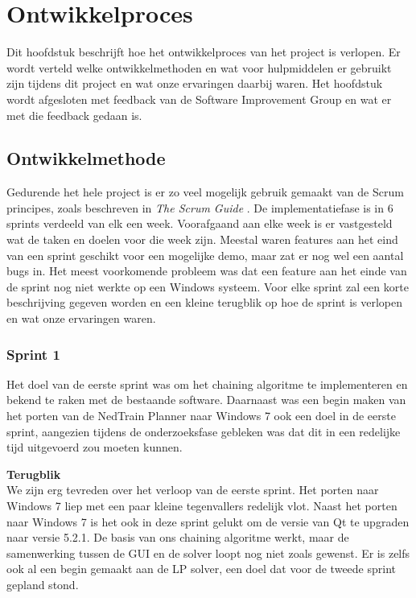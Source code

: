 \section{Ontwikkelproces}
Dit hoofdstuk beschrijft hoe het ontwikkelproces van het project is verlopen. Er wordt verteld welke ontwikkelmethoden en wat voor hulpmiddelen er gebruikt zijn tijdens dit project en wat onze ervaringen daarbij waren. Het hoofdstuk wordt afgesloten met feedback van de Software Improvement Group en wat er met die feedback gedaan is. 

\subsection{Ontwikkelmethode}
Gedurende het hele project is er zo veel mogelijk gebruik gemaakt van de Scrum principes, zoals beschreven in \emph{The Scrum Guide} \cite{schwaber2011}. De implementatiefase is in 6 sprints verdeeld van elk een week. Voorafgaand aan elke week is er vastgesteld wat de taken en doelen voor die week zijn.  Meestal waren features aan het eind van een sprint geschikt voor een mogelijke demo, maar zat er nog wel een aantal bugs in. Het meest voorkomende probleem was dat een feature aan het einde van de sprint nog niet werkte op een Windows systeem. Voor elke sprint zal een korte beschrijving gegeven worden en een kleine terugblik op hoe de sprint is verlopen en wat onze ervaringen waren.

\subsubsection{Sprint 1}
Het doel van de eerste sprint was om het chaining algoritme te implementeren en bekend te raken met de bestaande software. Daarnaast was een begin maken van het porten van de NedTrain Planner naar Windows 7 ook een doel in de eerste sprint, aangezien tijdens de onderzoeksfase gebleken was dat dit in een redelijke tijd uitgevoerd zou moeten kunnen.

\textbf{Terugblik} \\
We zijn erg tevreden over het verloop van de eerste sprint. Het porten naar Windows 7 liep met een paar kleine tegenvallers redelijk vlot. Naast het porten naar Windows 7 is het ook in deze sprint gelukt om de versie van Qt te upgraden naar versie 5.2.1. De basis van ons chaining algoritme werkt, maar de samenwerking tussen de GUI en de solver loopt nog niet zoals gewenst. Er is zelfs ook al een begin gemaakt aan de LP solver, een doel dat voor de tweede sprint gepland stond. 

